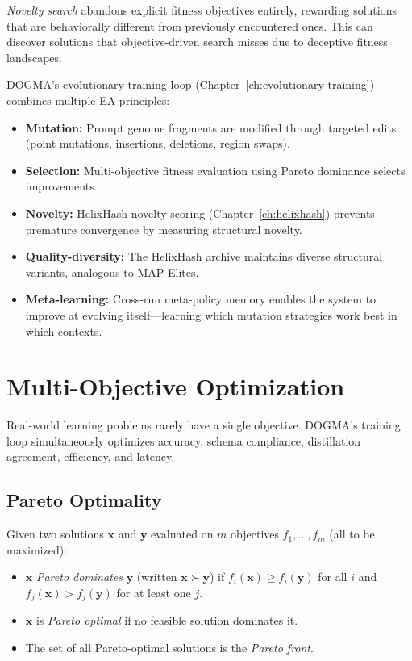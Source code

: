 \emph{Novelty search} \citep{lehman2011} abandons explicit fitness objectives entirely, rewarding solutions that are behaviorally different from previously encountered ones. This can discover solutions that objective-driven search misses due to deceptive fitness landscapes.

\begin{keyinsight}
DOGMA's evolutionary training loop (Chapter~\ref{ch:evolutionary-training}) combines multiple EA principles:
\begin{itemize}[leftmargin=1.5em]
  \item \textbf{Mutation:} Prompt genome fragments are modified through targeted edits (point mutations, insertions, deletions, region swaps).
  \item \textbf{Selection:} Multi-objective fitness evaluation using Pareto dominance selects improvements.
  \item \textbf{Novelty:} HelixHash novelty scoring (Chapter~\ref{ch:helixhash}) prevents premature convergence by measuring structural novelty.
  \item \textbf{Quality-diversity:} The HelixHash archive maintains diverse structural variants, analogous to MAP-Elites.
  \item \textbf{Meta-learning:} Cross-run meta-policy memory enables the system to improve at evolving itself---learning which mutation strategies work best in which contexts.
\end{itemize}
\end{keyinsight}

\section{Multi-Objective Optimization}
\label{sec:ml-multi-objective}

Real-world learning problems rarely have a single objective. DOGMA's training loop simultaneously optimizes accuracy, schema compliance, distillation agreement, efficiency, and latency.

\subsection{Pareto Optimality}

\begin{definition}
Given two solutions $\mathbf{x}$ and $\mathbf{y}$ evaluated on $m$ objectives $f_1, \ldots, f_m$ (all to be maximized):
\begin{itemize}[leftmargin=1.5em]
  \item $\mathbf{x}$ \emph{Pareto dominates} $\mathbf{y}$ (written $\mathbf{x} \succ \mathbf{y}$) if $f_i(\mathbf{x}) \geq f_i(\mathbf{y})$ for all $i$ and $f_j(\mathbf{x}) > f_j(\mathbf{y})$ for at least one $j$.
  \item $\mathbf{x}$ is \emph{Pareto optimal} if no feasible solution dominates it.
  \item The set of all Pareto-optimal solutions is the \emph{Pareto front}.
\end{itemize}
\end{definition}

